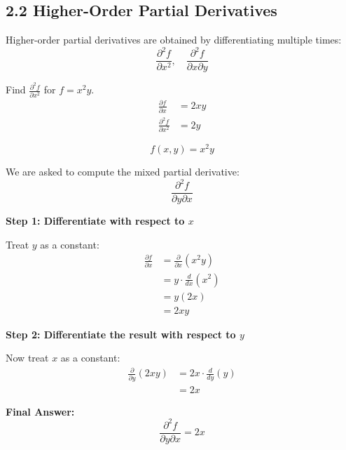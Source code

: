 \subsection*{2.2 Higher-Order Partial Derivatives}

\begin{conceptbox}
    Higher-order partial derivatives are obtained by differentiating multiple times:
    \begin{equation*}
        \frac{\partial^2 f}{\partial x^2}, \quad \frac{\partial^2 f}{\partial x \partial y}
    \end{equation*}
\end{conceptbox}

\begin{examplebox}
    Find $\frac{\partial^2 f}{\partial x^2}$ for $f=x^2y$.
    \begin{align*}
        \frac{\partial f}{\partial x}     & = 2xy \\
        \frac{\partial^2 f}{\partial x^2} & = 2y
    \end{align*}
\end{examplebox}

\begin{examplebox}
    \begin{equation*}
        f(x,y) = x^2y
    \end{equation*}

    We are asked to compute the mixed partial derivative:
    \begin{equation*}
        \frac{\partial^2 f}{\partial y \partial x}
    \end{equation*}

    \textbf{Step 1: Differentiate with respect to $x$}

    Treat $y$ as a constant:
    \begin{align*}
        \frac{\partial f}{\partial x}
         & = \frac{\partial}{\partial x}(x^2y) \\
         & = y \cdot \frac{d}{dx}(x^2)         \\
         & = y(2x)                             \\
         & = 2xy
    \end{align*}

    \textbf{Step 2: Differentiate the result with respect to $y$}

    Now treat $x$ as a constant:
    \begin{align*}
        \frac{\partial}{\partial y}(2xy)
         & = 2x \cdot \frac{d}{dy}(y) \\
         & = 2x
    \end{align*}

    \textbf{Final Answer:}
    \begin{equation*}
        \frac{\partial^2 f}{\partial y \partial x} = 2x
    \end{equation*}
\end{examplebox}

